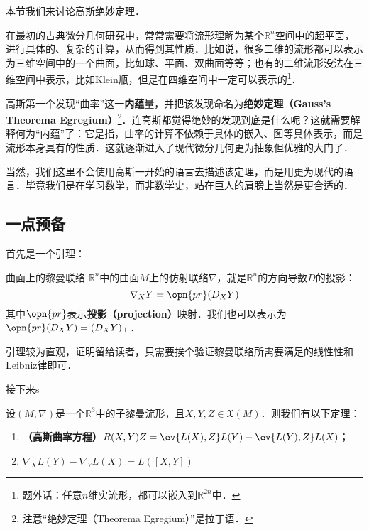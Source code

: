 

本节我们来讨论高斯绝妙定理．

在最初的古典微分几何研究中，常常需要将流形理解为某个$\mathbb{R}^n$空间中的超平面，进行具体的、复杂的计算，从而得到其性质．比如说，很多二维的流形都可以表示为三维空间中的一个曲面，比如球、平面、双曲面等等；也有的二维流形没法在三维空间中表示，比如Klein瓶，但是在四维空间中一定可以表示的\footnote{题外话：任意$n$维实流形，都可以嵌入到$\mathbb{R}^{2n}$中．}．

高斯第一个发现“曲率”这一\textbf{内蕴}量，并把该发现命名为\textbf{绝妙定理（Gauss's Theorema Egregium）}\footnote{注意“绝妙定理（Theorema Egregium）”是拉丁语．}．连高斯都觉得绝妙的发现到底是什么呢？这就需要解释何为“内蕴”了：它是指，曲率的计算不依赖于具体的嵌入、图等具体表示，而是流形本身具有的性质．这就逐渐进入了现代微分几何更为抽象但优雅的大门了．

当然，我们这里不会使用高斯一开始的语言去描述该定理，而是用更为现代的语言．毕竟我们是在学习数学，而非数学史，站在巨人的肩膀上当然是更合适的．

\subsection{一点预备}

首先是一个引理：

\begin{lemma}{曲面上的黎曼联络}
$\mathbb{R}^n$中的曲面$M$上的仿射联络$\nabla$，就是$\mathbb{R}^n$的方向导数$D$的投影：
\begin{equation}
\nabla_XY=\opn{pr}(D_XY)
\end{equation}
其中$\opn{pr}$表示\textbf{投影（projection）}映射．我们也可以表示为$\opn{pr}(D_XY)=(D_XY)_\perp$．
\end{lemma}

引理较为直观，证明留给读者，只需要挨个验证黎曼联络所需要满足的线性性和Leibniz律即可．

接下来s

\begin{theorem}{}
设$(M, \nabla)$是一个$\mathbb{R}^3$中的子黎曼流形，且$X, Y, Z\in\mathfrak{X}(M)$．则我们有以下定理：
\begin{enumerate}
\item \textbf{（高斯曲率方程）}$R(X, Y)Z=\ev{L(X), Z}L(Y)-\ev{L(Y), Z}L(X)$；
\item $\nabla_XL(Y)-\nabla_YL(X)=L([X, Y])$
\end{enumerate}
\end{theorem}

